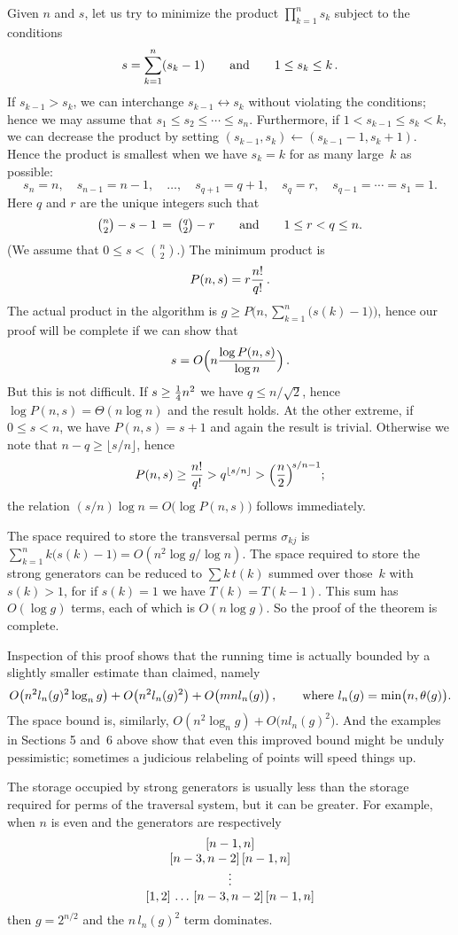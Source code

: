 Given $n$ and $s$, let us try to minimize the product $\prod_{k=1}^n s_k$
subject to the conditions
$$s=\sum_{k=1}^n(s_k-1)\qquad\hbox{and}\qquad 1\le s_k\le k\,.$$
If $s_{k-1}>s_k$, we can interchange $s_{k-1}\leftrightarrow s_k$
without violating the conditions; hence we may assume that $s_1\le s_2
\le\cdots\le s_n$. Furthermore, if $1<s_{k-1}\le s_k<k$, we can decrease
the product by setting $(s_{k-1},s_k)\gets(s_{k-1}-1,s_k+1)$. Hence the
product is smallest when we have $s_k=k$ for as many large~$k$ as possible:
$$s_n=n,\quad s_{n-1}=n-1,\quad \ldots,\quad s_{q+1}=q+1,\quad s_q=r,\quad
 s_{q-1}=\cdots=s_1=1.$$
Here $q$ and $r$ are the unique integers such that
$$\textstyle{n\choose2}-s-1\,=\,{q\choose2}-r\qquad\hbox{and}\qquad 1\le r<q\le n.$$
(We assume that $0\le s<{n\choose2}$.) The minimum product is
$$P(n,s)=r{n!\over q!}\,.$$
The actual product in the algorithm is $g\ge P\bigl(n,\sum_{k=1}^n\bigl(
s(k)-1\bigr)\bigr)$, hence our proof will be complete if we can show that
$$s=O\Bigl(n{\log P(n,s)\over\log n}\Bigr)\,.$$
But this is not difficult. If $s\ge{1\over4}n^2$ we have $q\le n/\sqrt2$,
hence $\log P(n,s)=\Theta(n\log n)$ and the result holds. At the other
extreme, if $0\le s<n$, we have $P(n,s)=s+1$ and again the result is trivial.
Otherwise we note that $n-q\ge\lfloor s/n\rfloor$, hence
$$P(n,s)\ge{n!\over q!}>q^{\lfloor s/n\rfloor}>\Bigl({n\over2}\Bigr)^{\!
s/n-1};$$
the relation $(s/n)\log n=O\bigl(\log P(n,s)\bigr)$ follows immediately.

The space required to store the transversal perms $\sigma_{kj}$ is
$\sum_{k=1}^nk\bigl(s(k)-1\bigr)=O(n^2\log g/\!\log n)$. The space
required to store the strong generators can be reduced to $\sum
k\,t(k)$ summed over those~$k$ with $s(k)>1$, for if $s(k)=1$ we have
$T(k)=T(k-1)$. This sum has $O(\log g)$ terms, each of which is
$O(n\log g)$. So the proof of the theorem is complete.

Inspection of this proof shows that the running time is actually bounded
by a slightly smaller estimate than claimed, namely
$$O\bigl(n^2 l_n(g)^2 \log_n g\bigr)+
O\bigl(n^2l_n(g)^2\bigr)+O\bigl(mnl_n(g)\bigr)\,,
\qquad\hbox{where $l_n(g)=\min\bigl(n,\theta(g)\bigr)$}.$$
The space bound is, similarly, $O(n^2\log_ng)+O\bigl(nl_n(g)^2\bigr)$.
And the examples in Sections 5 and~6 above show that even this improved
bound might be unduly pessimistic; sometimes a judicious relabeling of
points will speed things up.

The storage occupied by strong generators is usually less than the
storage required for perms of the traversal system, but it can be
greater. For example, when $n$ is even and the generators are respectively
$$\vcenter{\halign{$\hfil#\hfil$\cr
[n-1,n]\cr
[n-3,n-2]\,[n-1,n]\cr
\vdots\cr
[1,2]\,\ldots\,[n-3,n-2]\,[n-1,n]\cr}}$$
then $g=2^{n/2}$ and the $n\,l_n(g)^2$ term dominates.


